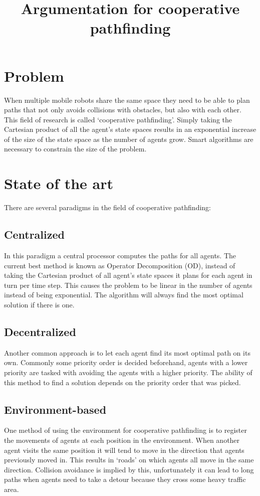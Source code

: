 \documentclass[a4paper]{article}
\title{Argumentation for cooperative pathfinding}
\author{}
\date{}
\begin{document}
\maketitle

\section*{Problem}
When multiple mobile robots share the same space they need to be able to plan
paths that not only avoids collisions with obstacles, but also with each other.
This field of research is called `cooperative pathfinding'. Simply taking the
Cartesian product of all the agent's state spaces results in an exponential
increase of the size of the state space as the number of agents grow. Smart
algorithms are necessary to constrain the size of the problem.

\section*{State of the art}
There are several paradigms in the field of cooperative pathfinding:

\subsection*{Centralized}
In this paradigm a central processor computes the paths for all agents. The
current best method is known as Operator Decomposition (OD), instead of taking
the Cartesian product of all agent's state spaces it plans for each agent in
turn per time step. This causes the problem to be linear in the number of agents
instead of being exponential. The algorithm will always find the most optimal
solution if there is one.

\subsection*{Decentralized}
Another common approach is to let each agent find its most optimal path on its
own. Commonly some priority order is decided beforehand, agents with a lower
priority are tasked with avoiding the agents with a higher priority. The ability
of this method to find a solution depends on the priority order that was picked.

\subsection*{Environment-based}
One method of using the environment for cooperative pathfinding is to register
the movements of agents at each position in the environment. When another agent
visits the same position it will tend to move in the direction that agents
previously moved in. This results in `roads' on which agents all move in the
same direction. Collision avoidance is implied by this, unfortunately it can
lead to long paths when agents need to take a detour because they cross some
heavy traffic area.
\end{document}
